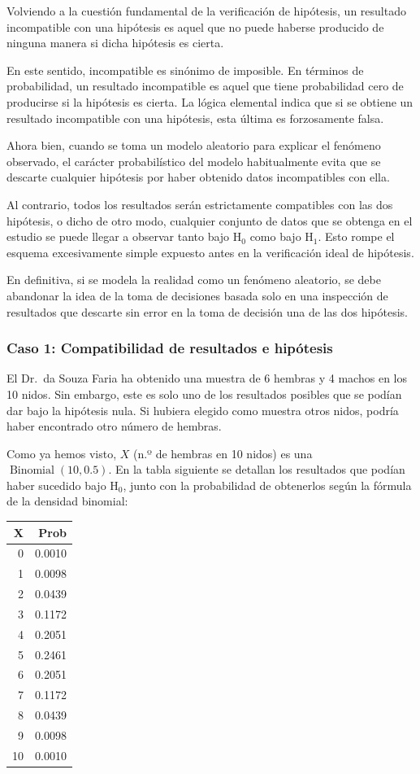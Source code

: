 \documentclass[
]{article}
\begin{document}
Volviendo a la cuestión fundamental de la verificación de hipótesis, un resultado incompatible con una hipótesis es aquel que no puede haberse producido de ninguna manera si dicha hipótesis es cierta.

En este sentido, incompatible es sinónimo de imposible. En términos de probabilidad, un resultado incompatible es aquel que tiene probabilidad cero de producirse si la hipótesis es cierta. La lógica elemental indica que si se obtiene un resultado incompatible con una hipótesis, esta última es forzosamente falsa.

Ahora bien, cuando se toma un modelo aleatorio para explicar el fenómeno observado, el carácter probabilístico del modelo habitualmente evita que se descarte cualquier hipótesis por haber obtenido datos incompatibles con ella.

Al contrario, todos los resultados serán estrictamente compatibles con las dos hipótesis, o dicho de otro modo, cualquier conjunto de datos que se obtenga en el estudio se puede llegar a observar tanto bajo \(\mathrm{H}_{0}\) como bajo \(\mathrm{H}_{1}\). Esto rompe el esquema excesivamente simple expuesto antes en la verificación ideal de hipótesis.

En definitiva, si se modela la realidad como un fenómeno aleatorio, se debe abandonar la idea de la toma de decisiones basada solo en una inspección de resultados que descarte sin error en la toma de decisión una de las dos hipótesis.

\subsubsection{Caso 1: Compatibilidad de resultados e hipótesis}\label{caso-1-compatibilidad-de-resultados-e-hipuxf3tesis}

El Dr.~da Souza Faria ha obtenido una muestra de 6 hembras y 4 machos en los 10 nidos. Sin embargo, este es solo uno de los resultados posibles que se podían dar bajo la hipótesis nula. Si hubiera elegido como muestra otros nidos, podría haber encontrado otro número de hembras.

Como ya hemos visto, \(X\) (n.º de hembras en 10 nidos) es una \(\operatorname{Binomial}(10,0.5)\). En la tabla siguiente se detallan los resultados que podían haber sucedido bajo \(\mathrm{H}_{0}\), junto con la probabilidad de obtenerlos según la fórmula de la densidad binomial:

\begin{tabular}{r|r}
\hline
X & Prob\\
\hline
0 & 0.0010\\
\hline
1 & 0.0098\\
\hline
2 & 0.0439\\
\hline
3 & 0.1172\\
\hline
4 & 0.2051\\
\hline
5 & 0.2461\\
\hline
6 & 0.2051\\
\hline
7 & 0.1172\\
\hline
8 & 0.0439\\
\hline
9 & 0.0098\\
\hline
10 & 0.0010\\
\hline
\end{tabular}
\end{document}
